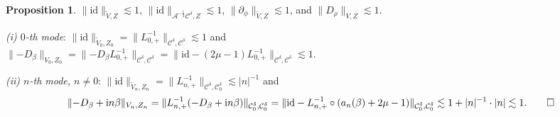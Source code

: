 \documentclass[11pt]{article}
\makeatletter
\renewenvironment{proof}[1][\proofname]{\par
  \vspace{-.7\topsep}%
  \pushQED{\qed}%
  \normalfont
  \topsep0pt \partopsep0pt %
  \trivlist
  \item[\hskip\labelsep
        \itshape
    #1\@addpunct{.}]\ignorespaces
}{%
  \popQED\endtrivlist\@endpefalse
  \addvspace{6pt plus 6pt} %
}
\theoremstyle{definition}
\newtheorem{prop}[theorem]{Proposition}
\theoremstyle{remark}
\numberwithin{equation}{section}
\newcommand{\mcal}{\mathcal}
\renewcommand{\tilde}{\widetilde}
\newcommand{\del}{\partial}
\newcommand{\norm}[1]{\lVert #1 \rVert}
\makeatother
\begin{document}
\begin{prop} \label{prop:3.8}
$\norm{\text{id}}_{\tilde{V}, Z} \lesssim 1$, $\norm{\text{id}}_{\mcal{A}^{-\frac{1}{2}} \mcal{C}^\delta, Z} \lesssim 1$, $\norm{\del_\phi}_{\tilde{V}, Z} \lesssim 1$, and $\norm{D_\rho}_{V, Z} \lesssim 1$.
\end{prop}
\begin{proof}
\noindent\textit{(i) $0$-th mode}: $\norm{\text{id}}_{\tilde{V}_0, Z_0} = \norm{L_{0,+}^{-1}}_{\mcal{C}^\delta, \mcal{C}^\delta} \lesssim 1$ and \\$\norm{-D_\beta}_{V_0, Z_0} = \norm{-D_\beta L_{0,+}^{-1}}_{\mcal{C}^\delta, \mcal{C}^\delta} = \norm{\text{id} - (2\mu - 1) L_{0,+}^{-1}}_{\mcal{C}^\delta, \mcal{C}^\delta} \lesssim 1$.

\noindent\textit{(ii) $n$-th mode, $n\neq 0$}: $\norm{\text{id}}_{\tilde{V}_n, Z_n} = \norm{L_{n,+}^{-1}}_{\mcal{C}^\delta, \mcal{C}^\delta_0} \lesssim |n|^{-1}$ and
\[\norm{-D_\beta + \textrm{i}n\beta}_{V_n, Z_n} = \norm{L_{n,+}^{-1}(-D_\beta + \textrm{i}n\beta)}_{\mcal{C}^\delta_0, \mcal{C}^\delta_0} = \norm{\text{id} - L_{n,+}^{-1} \circ (a_n(\beta) + 2\mu - 1)}_{\mcal{C}^\delta_0, \mcal{C}^\delta_0} \lesssim 1 + |n|^{-1} \cdot |n| \lesssim 1. \qedhere\]
\end{proof}
\end{document}
